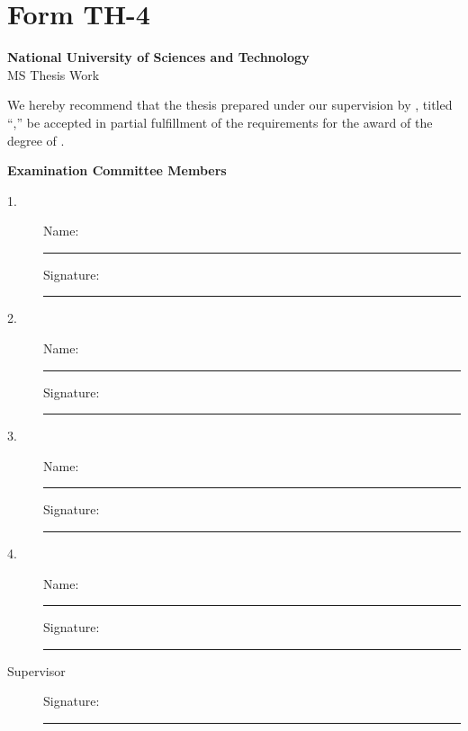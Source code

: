 \chapter*{Form TH-4}
\thispagestyle{empty}
\begin{center}
\textbf{National University of Sciences and Technology}\\[0.2cm]
MS Thesis Work
\end{center}
\begin{justify}
We hereby recommend that the thesis prepared under our supervision by \StudentName, titled ``\ThesisTitle,'' be accepted in partial fulfillment of the requirements for the award of the degree of \DegreeName.
\end{justify}
\vspace{0.8cm}
\begin{center}
\textbf{Examination Committee Members}
\end{center}
\begin{description}
\item[1.] Name: \rule{8cm}{0.4pt} Signature: \rule{3cm}{0.4pt}
\item[2.] Name: \rule{8cm}{0.4pt} Signature: \rule{3cm}{0.4pt}
\item[3.] Name: \rule{8cm}{0.4pt} Signature: \rule{3cm}{0.4pt}
\item[4.] Name: \rule{8cm}{0.4pt} Signature: \rule{3cm}{0.4pt}
\item[Supervisor] \SupervisorName\hfill Signature: \rule{3cm}{0.4pt}
\end{description}
\clearpage
